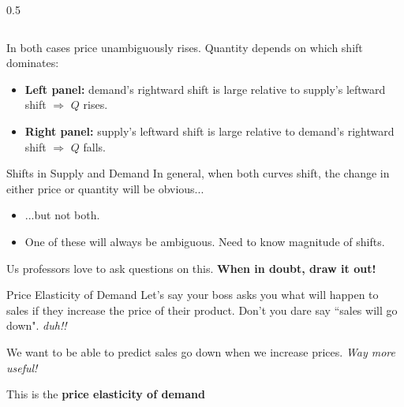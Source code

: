\documentclass[12pt,t]{beamer}
\begin{document}
\begin{frame}[shrink]
\begin{columns}[T]
\begin{column}{0.5\textwidth}
    \end{column}
  \end{columns}

  \bigskip
  In both cases price unambiguously rises. Quantity depends on which shift dominates:
  \begin{itemize}
    \item \textbf{Left panel:} demand's rightward shift is large relative to supply's leftward shift $\Rightarrow$ $Q$ rises.
    \item \textbf{Right panel:} supply's leftward shift is large relative to demand's rightward shift $\Rightarrow$ $Q$ falls.
  \end{itemize}
\end{frame}

\begin{frame}{Shifts in Supply and Demand}
  In general, when both curves shift, the change in either price or quantity will be obvious...

  \begin{itemize}
    \item ...but not both.

    \item One of these will always be ambiguous. Need to know magnitude of shifts.
  \end{itemize}

  \bigskip
  Us professors love to ask questions on this. \textbf{When in doubt, draw it out!}
\end{frame}

\begin{frame}{Price Elasticity of Demand}
  Let's say your boss asks you what will happen to sales if they increase the price of their product. Don't you dare say ``sales will go down". 
  \emph{duh!!}

  \bigskip
  We want to be able to predict  sales go down when we increase prices. \emph{Way more useful!}

  \bigskip
  This is the \textbf{price elasticity of demand}
\end{frame}
\end{document}

